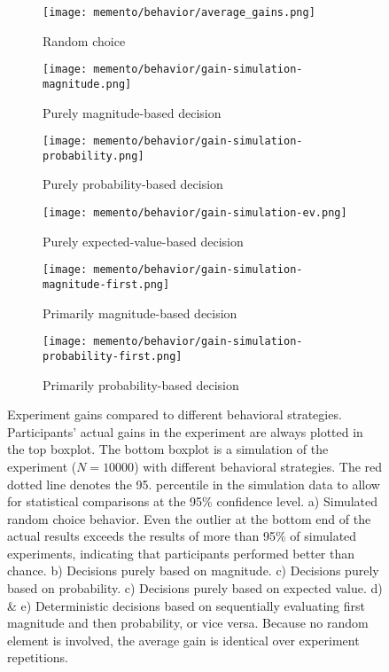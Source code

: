 \begin{figure}
	\begin{subfigure}{0.5\textwidth}
		\texttt{[image: memento/behavior/average\_gains.png]}
		\caption{Random choice}
		\label{fig:gains}
	\end{subfigure}
	\begin{subfigure}{0.5\textwidth}
		\texttt{[image: memento/behavior/gain-simulation-magnitude.png]}
		\caption{Purely magnitude-based decision}
		\label{fig:strategy-prob}
	\end{subfigure}
	\begin{subfigure}{0.5\textwidth}
		\texttt{[image: memento/behavior/gain-simulation-probability.png]}
		\caption{Purely probability-based decision}
		\label{fig:strategy-mag}
	\end{subfigure}
	\begin{subfigure}{0.5\textwidth}
		\texttt{[image: memento/behavior/gain-simulation-ev.png]}
		\caption{Purely expected-value-based decision}
		\label{fig:strategy-ev}
	\end{subfigure}
	\begin{subfigure}{0.5\textwidth}
		\texttt{[image: memento/behavior/gain-simulation-magnitude-first.png]}
		\caption{Primarily magnitude-based decision}
		\label{fig:strategy-mag-first}
	\end{subfigure}
	\begin{subfigure}{0.5\textwidth}
		\texttt{[image: memento/behavior/gain-simulation-probability-first.png]}
		\caption{Primarily probability-based decision}
		\label{fig:strategy-prob-first}
	\end{subfigure}
	\caption[Experiment gains compared to different behavioral strategies]{Experiment gains compared to different behavioral strategies. Participants' actual gains in the experiment are always plotted in the top boxplot. The bottom boxplot is a simulation of the experiment ($N=10000$) with different behavioral strategies. The red dotted line denotes the 95. percentile in the simulation data to allow for statistical comparisons at the 95\% confidence level. a) Simulated random choice behavior. Even the outlier at the bottom end of the actual results exceeds the results of more than 95\% of simulated experiments, indicating that participants performed better than chance. b) Decisions purely based on magnitude. c) Decisions purely based on probability. c) Decisions purely based on expected value. d) \& e) Deterministic decisions based on sequentially evaluating first magnitude and then probability, or vice versa. Because no random element is involved, the average gain is identical over experiment repetitions.}
\end{figure}



